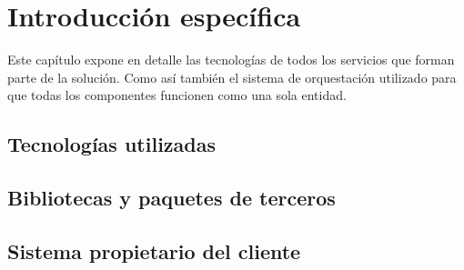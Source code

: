 \chapter{Introducción específica} %

\label{Chapter2}

Este capítulo expone en detalle las tecnologías de todos los servicios que forman parte de la solución. Como así también el sistema de orquestación utilizado para que todas los componentes funcionen como una sola entidad.

\section{Tecnologías utilizadas}
	
\section{Bibliotecas y paquetes de terceros}
	
\section{Sistema propietario del cliente}